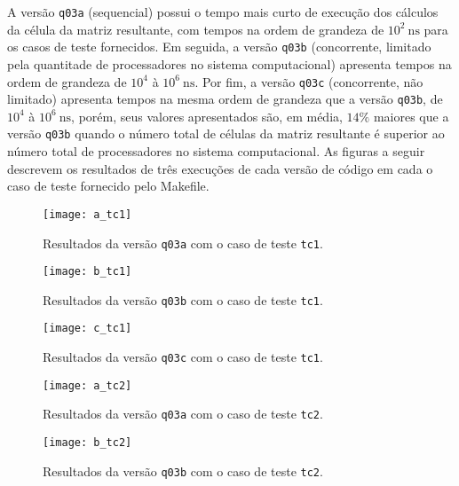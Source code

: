 A versão \texttt{q03a} (sequencial) possui o tempo mais curto de execução dos cálculos da célula da matriz resultante, com tempos na ordem de grandeza de $10^2 \ \text{ns}$  para os casos de teste fornecidos. Em seguida, a versão \texttt{q03b} (concorrente, limitado pela quantitade de processadores no sistema computacional) apresenta tempos na ordem de grandeza de $10^4$ à $10^6 \ \text{ns}$. Por fim, a versão \texttt{q03c} (concorrente, não limitado) apresenta tempos na mesma ordem de grandeza que a versão \texttt{q03b}, de $10^4$ à $10^6 \ \text{ns}$, porém, seus valores apresentados são, em média, $14\%$ maiores que a versão \texttt{q03b} quando o número total de células da matriz resultante é superior ao número total de processadores no sistema computacional. As figuras a seguir descrevem os resultados de três execuções de cada versão de código em cada o caso de teste fornecido pelo Makefile.

\begin{figure}[H]
	\begin{center}
		\texttt{[image: a\_tc1]}
		\caption{Resultados da versão \texttt{q03a} com o caso de teste \texttt{tc1}.}
		\label{fig:a_tc1}
	\end{center}
\end{figure}

\begin{figure}[H]
	\begin{center}
		\texttt{[image: b\_tc1]}
		\caption{Resultados da versão \texttt{q03b} com o caso de teste \texttt{tc1}.}
		\label{fig:b_tc1}
	\end{center}
\end{figure}

\begin{figure}[H]
	\begin{center}
		\texttt{[image: c\_tc1]}
		\caption{Resultados da versão \texttt{q03c} com o caso de teste \texttt{tc1}.}
		\label{fig:c_tc1}
	\end{center}
\end{figure}

\begin{figure}[H]
	\begin{center}
		\texttt{[image: a\_tc2]}
		\caption{Resultados da versão \texttt{q03a} com o caso de teste \texttt{tc2}.}
		\label{fig:a_tc2}
	\end{center}
\end{figure}

\begin{figure}[H]
	\begin{center}
		\texttt{[image: b\_tc2]}
		\caption{Resultados da versão \texttt{q03b} com o caso de teste \texttt{tc2}.}
		\label{fig:b_tc2}
	\end{center}
\end{figure}

